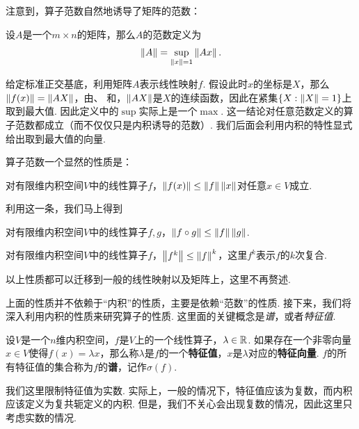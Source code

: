 注意到，算子范数自然地诱导了矩阵的范数：
\begin{definition}[矩阵范数]
    设$A$是一个$m\times n$的矩阵，那么$A$的范数定义为
    \[\left\|A\right\|=\sup_{\left\|x\right\|=1}\left\|Ax\right\|.\]
\end{definition}

给定标准正交基底，利用矩阵$A$表示线性映射$f$. 假设此时$x$的坐标是$X$，那么$\left\|f(x)\right\|=\left\|AX\right\|$，由、 和，$\left\|AX\right\|$是$X$的连续函数，因此在紧集$\{X:\left\|X\right\|=1\}$上取到最大值. 因此定义中的$\sup$实际上是一个$\max$. 这一结论对任意范数定义的算子范数都成立（而不仅仅只是内积诱导的范数）. 我们后面会利用内积的特性显式给出取到最大值的向量. 

算子范数一个显然的性质是：

\begin{proposition}\label{proposition:norm-ineq}
对有限维内积空间$V$中的线性算子$f$，$\left\|f(x)\right\|\leq \left\|f\right\|\left\|x\right\|$对任意$x\in V$成立. 
\end{proposition}

利用这一条，我们马上得到

\begin{proposition}\label{proposition:operator-norm-ineq}
对有限维内积空间$V$中的线性算子$f,g$，$\left\|f\circ g\right\|\leq \left\|f\right\|\left\|g\right\|$.
\end{proposition}

\begin{proposition}\label{proposition:operator-power-norm-ineq}
    对有限维内积空间$V$中的线性算子$f$，$\left\|f^k\right\|\leq \left\|f\right\|^k$，这里$f^k$表示$f$的$k$次复合. 
\end{proposition}

以上性质都可以迁移到一般的线性映射以及矩阵上，这里不再赘述. 

上面的性质并不依赖于“内积”的性质，主要是依赖“范数”的性质. 接下来，我们将深入利用内积的性质来研究算子的性质. 这里面的关键概念是\textit{谱}，或者\textit{特征值}. 

\begin{definition}
设$V$是一个$n$维内积空间，$f$是$V$上的一个线性算子，$\lambda\in\mathbb{R}$. 如果存在一个非零向量$x\in V$使得$f(x)=\lambda x$，那么称$\lambda$是$f$的一个\textbf{特征值}，$x$是$\lambda$对应的\textbf{特征向量}. $f$的所有特征值的集合称为$f$的\textbf{谱}，记作$\sigma(f)$. 
\end{definition}

我们这里限制特征值为实数. 实际上，一般的情况下，特征值应该为复数，而内积应该定义为复共轭定义的内积. 但是，我们不关心会出现复数的情况，因此这里只考虑实数的情况. 

